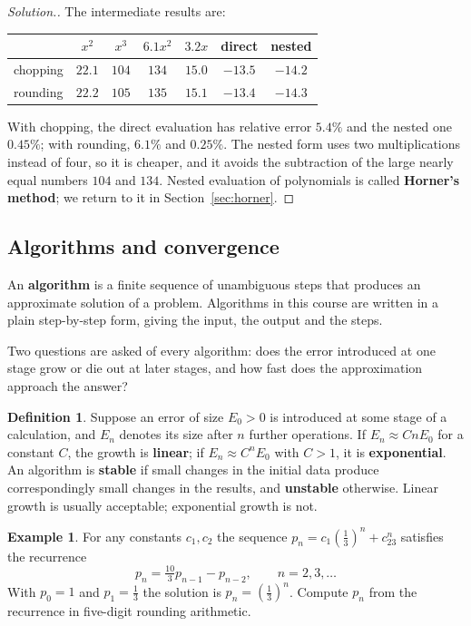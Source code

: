 \documentclass[11pt,a4paper]{article}
\numberwithin{equation}{section}
\theoremstyle{definition}
\newtheorem{defn}[thm]{Definition}
\newtheorem{exa}[thm]{Example}
\newenvironment{solution}
  {\renewcommand{\qedsymbol}{}\begin{proof}[\textit{Solution}.]}
  {\end{proof}}
\begin{document}
\begin{solution}
The intermediate results are:
\begin{center}
\begin{tabular}{lcccccc}
\hline
 & $x^2$ & $x^3$ & $6.1x^2$ & $3.2x$ & direct & nested\\
\hline
chopping & $22.1$ & $104$ & $134$ & $15.0$ & $-13.5$ & $-14.2$\\
rounding & $22.2$ & $105$ & $135$ & $15.1$ & $-13.4$ & $-14.3$\\
\hline
\end{tabular}
\end{center}
With chopping, the direct evaluation has relative error $5.4\%$ and the nested one $0.45\%$; with rounding, $6.1\%$ and $0.25\%$. The
nested form uses two multiplications instead of four, so it is cheaper, and it avoids the subtraction of the large nearly equal numbers
$104$ and $134$. Nested evaluation of polynomials is called \textbf{Horner's method}; we return to it in Section~\ref{sec:horner}.
\end{solution}


\subsection{Algorithms and convergence}
\label{sec:alg}

An \textbf{algorithm} is a finite sequence of unambiguous steps that produces an approximate solution of a problem. Algorithms in this
course are written in a plain step-by-step form, giving the input, the output and the steps.

Two questions are asked of every algorithm: does the error introduced at one stage grow or die out at later stages, and how fast does
the approximation approach the answer?

\begin{defn}
Suppose an error of size $E_0>0$ is introduced at some stage of a calculation, and $E_n$ denotes its size after $n$ further operations.
If $E_n\approx CnE_0$ for a constant $C$, the growth is \textbf{linear}; if $E_n\approx C^nE_0$ with $C>1$, it is \textbf{exponential}.
An algorithm is \textbf{stable} if small changes in the initial data produce correspondingly small changes in the results, and
\textbf{unstable} otherwise. Linear growth is usually acceptable; exponential growth is not.
\end{defn}

\begin{exa}
\label{exa:recurrence}
For any constants $c_1, c_2$ the sequence $p_n = c_1\left(\frac13\right)^n+c_23^n$ satisfies the recurrence
$$p_n = \tfrac{10}{3}p_{n-1}-p_{n-2},\qquad n = 2,3,\dots$$
With $p_0 = 1$ and $p_1 = \frac13$ the solution is $p_n = \left(\frac13\right)^n$. Compute $p_n$ from the recurrence in five-digit
rounding arithmetic.
\end{exa}
\end{document}
